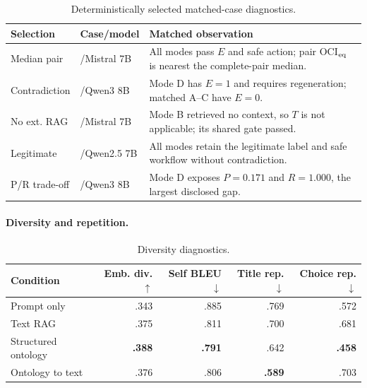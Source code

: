 \documentclass[runningheads]{llncs}
\begin{document}
\begin{table}[!h]
\caption{Deterministically selected matched-case diagnostics.}
\label{tab:five-cases}
\centering
\fontsize{7.0}{7.6}\selectfont
\setlength{\tabcolsep}{2.5pt}
\begin{tabularx}{0.97\textwidth}{@{}>{\raggedright\arraybackslash}p{1.7cm}>{\raggedright\arraybackslash}p{2.15cm}X@{}}
\toprule
\textbf{Selection} & \textbf{Case/model} & \textbf{Matched observation}\\
\midrule
Median pair & 053/Mistral 7B & All modes pass $E$ and safe action; pair OCI$_{\rm eq}$ is nearest the complete-pair median.\\
Contradiction & 023/Qwen3 8B & Mode D has $E=1$ and requires regeneration; matched A--C have $E=0$.\\
No ext. RAG & 002/Mistral 7B & Mode B retrieved no context, so $T$ is not applicable; its shared gate passed.\\
Legitimate & 070/Qwen2.5 7B & All modes retain the legitimate label and safe workflow without contradiction.\\
P/R trade-off & 064/Qwen3 8B & Mode D exposes $P=0.171$ and $R=1.000$, the largest disclosed gap.\\
\bottomrule
\end{tabularx}
\end{table}

\paragraph{Diversity and repetition.}

\begin{table}[!h]
\caption{Diversity diagnostics.}
\label{tab:diversity}
\centering
\scriptsize
\setlength{\tabcolsep}{4pt}
\begin{tabular}{@{}>{\raggedright\arraybackslash}p{3.3cm}rrrr@{}}
\toprule
\textbf{Condition} & \textbf{Emb. div. $\uparrow$} &
\textbf{Self BLEU $\downarrow$} & \textbf{Title rep. $\downarrow$} &
\textbf{Choice rep. $\downarrow$}\\
\midrule
Prompt only & .343 & .885 & .769 & .572\\
Text RAG & .375 & .811 & .700 & .681\\
Structured ontology & \textbf{.388} & \textbf{.791} & .642 & \textbf{.458}\\
Ontology to text & .376 & .806 & \textbf{.589} & .703\\
\bottomrule
\end{tabular}
\end{table}
\end{document}
